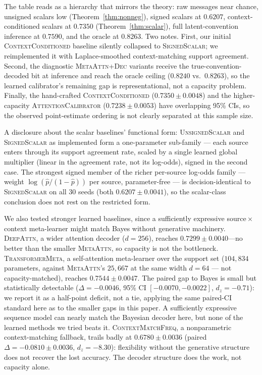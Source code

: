 {\sloppy
The table reads as a hierarchy that mirrors the theory: raw messages near
chance, unsigned scalars low (Theorem~\ref{thm:nonneg}), signed scalars at
$0.6207$, context-conditioned scalars at $0.7350$ (Theorem~\ref{thm:scalar}),
full latent-convention inference at $0.7590$, and the oracle at $0.8263$.
Two notes. First, our initial \textsc{ContextConditioned} baseline
silently collapsed to \textsc{SignedScalar}; we reimplemented it with
Laplace-smoothed context-matching support agreement. Second, the
diagnostic \textsc{MetaAttn+Dec} variants receive the true-convention-decoded
bit at inference and reach the oracle ceiling ($0.8240$ vs.\ $0.8263$), so
the learned calibrator's remaining gap is representational, not a
capacity problem. Finally, the hand-crafted
\textsc{ContextConditioned} ($0.7350 \pm 0.0048$) and the higher-capacity
\textsc{AttentionCalibrator} ($0.7238 \pm 0.0053$) have overlapping 95\%
CIs, so the observed point-estimate ordering is not clearly separated at
this sample size.

A disclosure about the scalar baselines' functional form:
\textsc{UnsignedScalar} and \textsc{SignedScalar} as implemented form
a one-parameter sub-family --- each source enters through its support
agreement rate, scaled by a single learned global multiplier (linear in
the agreement rate, not its log-odds), signed in the second case. The
strongest signed member of the richer per-source log-odds family ---
weight $\log(\hat p/(1-\hat p))$ per source, parameter-free --- is
decision-identical to \textsc{SignedScalar} on all 30 seeds (both
$0.6207 \pm 0.0041$), so the scalar-class conclusion does not rest on
the restricted form.

We also tested stronger learned baselines, since a sufficiently
expressive source${}\times{}$context meta-learner might match Bayes
without generative machinery.
\textsc{DeepAttn}, a wider attention decoder ($d=256$), reaches
$0.7299 \pm 0.0040$---no better than the smaller \textsc{MetaAttn}, so
capacity is not the bottleneck. \textsc{TransformerMeta}, a
self-attention meta-learner over the support set ($104{,}834$
parameters, against \textsc{MetaAttn}'s $25{,}667$ at the same width
$d=64$ --- not capacity-matched), reaches $0.7544 \pm 0.0047$. The
paired gap to Bayes is small but statistically detectable
($\Delta = -0.0046$, 95\% CI $[-0.0070, -0.0022]$, $d_z = -0.71$): we
report it as a half-point deficit, not a tie, applying the same
paired-CI standard here as to the smaller gaps in this paper. A
sufficiently expressive sequence model can nearly match the Bayesian
decoder here, but none of the learned methods we tried beats it.
\textsc{ContextMatchFreq}, a nonparametric context-matching fallback,
trails badly at $0.6780 \pm 0.0036$ (paired $\Delta = -0.0810
\pm 0.0036$, $d_z = -8.30$): flexibility without the generative structure
does not recover the lost accuracy. The decoder structure does the work,
not capacity alone.

}

